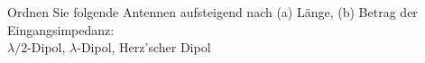\begin{question}[section=11,name={Antennen ordnen},difficulty=,quantity=,type=thr,tags={20130724}]
	Ordnen Sie folgende Antennen aufsteigend nach (a) Länge, (b) Betrag der Eingangsimpedanz:\\
	$\lambda/2$-Dipol, $\lambda$-Dipol, Herz'scher Dipol
	
	
\end{question}
\begin{solution}
	
\end{solution}